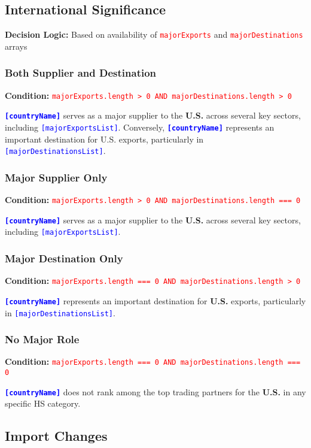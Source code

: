 \documentclass[12pt]{article}
\newcommand{\var}[1]{\textcolor{blue}{\texttt{[#1]}}}
\newcommand{\bold}[1]{\textbf{#1}}
\newcommand{\cond}[1]{\textcolor{red}{\texttt{#1}}}
\begin{document}
\subsection{International Significance}

\textbf{Decision Logic:} Based on availability of \cond{majorExports} and \cond{majorDestinations} arrays

\subsubsection{Both Supplier and Destination}
\textbf{Condition:} \cond{majorExports.length > 0 AND majorDestinations.length > 0}

\bold{\var{countryName}} serves as a major supplier to the \bold{U.S.} across several key sectors, including \var{majorExportsList}. Conversely, \bold{\var{countryName}} represents an important destination for U.S. exports, particularly in \var{majorDestinationsList}.

\subsubsection{Major Supplier Only}
\textbf{Condition:} \cond{majorExports.length > 0 AND majorDestinations.length === 0}

\bold{\var{countryName}} serves as a major supplier to the \bold{U.S.} across several key sectors, including \var{majorExportsList}.

\subsubsection{Major Destination Only}
\textbf{Condition:} \cond{majorExports.length === 0 AND majorDestinations.length > 0}

\bold{\var{countryName}} represents an important destination for \bold{U.S.} exports, particularly in \var{majorDestinationsList}.

\subsubsection{No Major Role}
\textbf{Condition:} \cond{majorExports.length === 0 AND majorDestinations.length === 0}

\bold{\var{countryName}} does not rank among the top trading partners for the \bold{U.S.} in any specific HS category.

\subsection{Import Changes}
\end{document}
